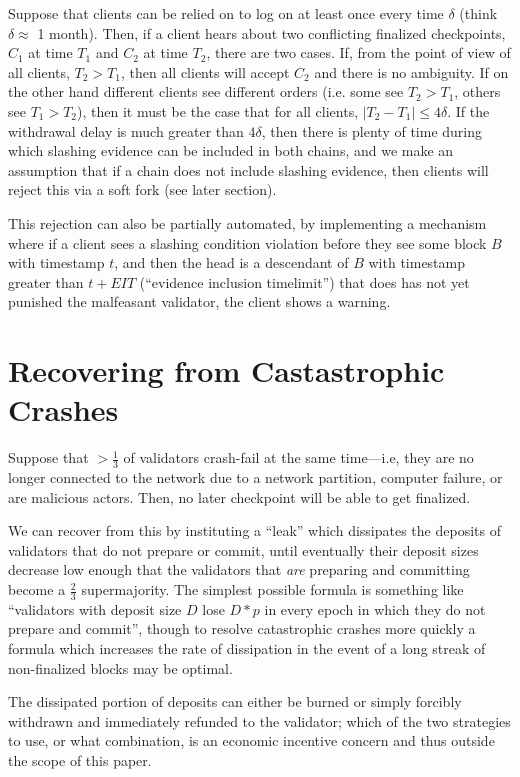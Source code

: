 \documentclass[12pt, final]{article}
\begin{document}
Suppose that clients can be relied on to log on at least once every time $\delta$ (think $\delta \approx$ 1 month). Then, if a client hears about two conflicting finalized checkpoints, $C_1$ at time $T_1$ and $C_2$ at time $T_2$, there are two cases. If, from the point of view of all clients, $T_2 > T_1$, then all clients will accept $C_2$ and there is no ambiguity. If on the other hand different clients see different orders (i.e. some see $T_2 > T_1$, others see $T_1 > T_2$), then it must be the case that for all clients, $|T_2 - T_1| \le 4\delta$. If the withdrawal delay is much greater than $4\delta$, then there is plenty of time during which slashing evidence can be included in both chains, and we make an assumption that if a chain does not include slashing evidence, then clients will reject this via a soft fork (see later section).

This rejection can also be partially automated, by implementing a mechanism where if a client sees a slashing condition violation before they see some block $B$ with timestamp $t$, and then the head is a descendant of $B$ with timestamp greater than $t + EIT$ (``evidence inclusion timelimit'') that does has not yet punished the malfeasant validator, the client shows a warning.

\section{Recovering from Castastrophic Crashes}
\label{sect:leak}

Suppose that $>\frac{1}{3}$ of validators crash-fail at the same time---i.e, they are no longer connected to the network due to a network partition, computer failure, or are malicious actors. Then, no later checkpoint will be able to get finalized.

We can recover from this by instituting a ``leak'' which dissipates the deposits of validators that do not prepare or commit, until eventually their deposit sizes decrease low enough that the validators that \textit{are} preparing and committing become a $\frac{2}{3}$ supermajority. The simplest possible formula is something like ``validators with deposit size $D$ lose $D * p$ in every epoch in which they do not prepare and commit'', though to resolve catastrophic crashes more quickly a formula which increases the rate of dissipation in the event of a long streak of non-finalized blocks may be optimal.

The dissipated portion of deposits can either be burned or simply forcibly withdrawn and immediately refunded to the validator; which of the two strategies to use, or what combination, is an economic incentive concern and thus outside the scope of this paper.
\end{document}
